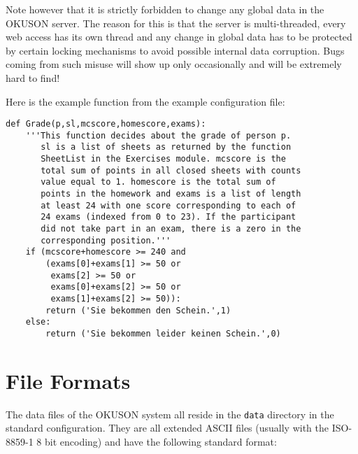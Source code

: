 \documentclass[12pt,openany,a4paper]{book}
\newcommand{\OKUSON}{\textsf{OKUSON}}
\begin{document}
Note however that it is strictly forbidden to change any global data in the
{\OKUSON} server. The reason for this is that the server is multi-threaded,
every web access has its own thread and any change in global data has to
be protected by certain locking mechanisms to avoid possible internal
data corruption. Bugs coming from such misuse will show up only
occasionally and will be extremely hard to find!

Here is the example function from the example configuration file:
\begin{verbatim}
def Grade(p,sl,mcscore,homescore,exams):
    '''This function decides about the grade of person p. 
       sl is a list of sheets as returned by the function
       SheetList in the Exercises module. mcscore is the
       total sum of points in all closed sheets with counts
       value equal to 1. homescore is the total sum of
       points in the homework and exams is a list of length
       at least 24 with one score corresponding to each of
       24 exams (indexed from 0 to 23). If the participant
       did not take part in an exam, there is a zero in the
       corresponding position.'''
    if (mcscore+homescore >= 240 and 
        (exams[0]+exams[1] >= 50 or
         exams[2] >= 50 or
         exams[0]+exams[2] >= 50 or
         exams[1]+exams[2] >= 50)):
        return ('Sie bekommen den Schein.',1)
    else:
        return ('Sie bekommen leider keinen Schein.',0)
\end{verbatim}

\chapter{File Formats}
\label{ch:fileformats}

The data files of the {\OKUSON} system all reside in the \texttt{data}
directory in the standard configuration. They are all extended ASCII files
(usually with the ISO-8859-1 8 bit encoding) and have the following
standard format:
\end{document}
